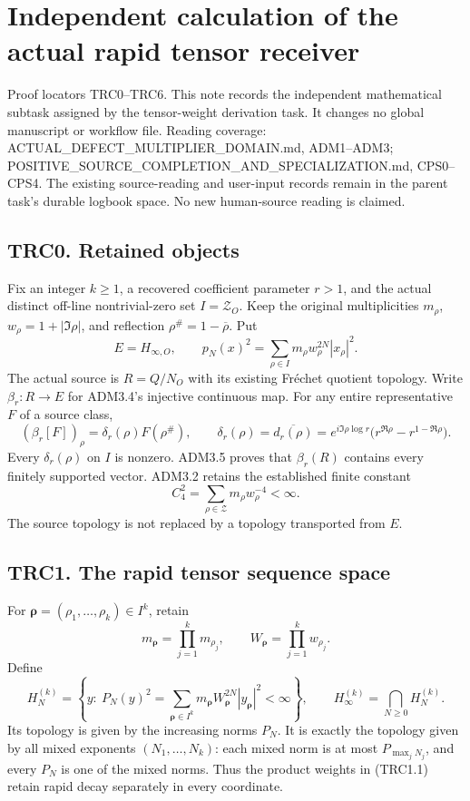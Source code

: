 \chapter{Independent calculation of the actual rapid tensor
receiver}\label{independent-calculation-of-the-actual-rapid-tensor-receiver}

Proof locators TRC0--TRC6. This note records the independent
mathematical subtask assigned by the tensor-weight derivation task. It
changes no global manuscript or workflow file. Reading coverage:
ACTUAL\_DEFECT\_MULTIPLIER\_DOMAIN.md, ADM1--ADM3;
POSITIVE\_SOURCE\_COMPLETION\_AND\_SPECIALIZATION.md, CPS0--CPS4. The
existing source-reading and user-input records remain in the parent
task's durable logbook space. No new human-source reading is claimed.

\section{TRC0. Retained objects}\label{trc0.-retained-objects}

Fix an integer \(k\ge1\), a recovered coefficient parameter \(r>1\), and
the actual distinct off-line nontrivial-zero set \(I=\mathscr Z_O\).
Keep the original multiplicities \(m_\rho\), \(w_\rho=1+|\Im\rho|\), and
reflection \(\rho^\#=1-\overline\rho\). Put \[
E=H_{\infty,O},\qquad p_N(x)^2=\sum_{\rho\in I}m_\rho w_\rho^{2N}|x_\rho|^2.
\] The actual source is \(R=Q/N_O\) with its existing Fréchet quotient
topology. Write \(\beta_r:R\to E\) for ADM3.4's injective continuous
map. For any entire representative \(F\) of a source class, \[
(\beta_r[F])_\rho=\delta_r(\rho)F(\rho^\#),\qquad
\delta_r(\rho)=\overline{d_r(\rho)}
=e^{i\Im\rho\log r}\bigl(r^{\Re\rho}-r^{1-\Re\rho}\bigr).
\tag{TRC0.1}
\] Every \(\delta_r(\rho)\) on \(I\) is nonzero. ADM3.5 proves that
\(\beta_r(R)\) contains every finitely supported vector. ADM3.2 retains
the established finite constant \[
C_4^2=\sum_{\rho\in\mathscr Z}m_\rho w_\rho^{-4}<\infty.
\tag{TRC0.2}
\] The source topology is not replaced by a topology transported from
\(E\).

\section{TRC1. The rapid tensor sequence
space}\label{trc1.-the-rapid-tensor-sequence-space}

For \(\boldsymbol\rho=(\rho_1,\ldots,\rho_k)\in I^k\), retain \[
m_{\boldsymbol\rho}=\prod_{j=1}^k m_{\rho_j},\qquad
W_{\boldsymbol\rho}=\prod_{j=1}^k w_{\rho_j}.
\] Define \[
H_N^{(k)}=\left\{y:\ P_N(y)^2=
\sum_{\boldsymbol\rho\in I^k}m_{\boldsymbol\rho}
W_{\boldsymbol\rho}^{2N}|y_{\boldsymbol\rho}|^2<\infty\right\},
\qquad H_\infty^{(k)}=\bigcap_{N\ge0}H_N^{(k)}.
\tag{TRC1.1}
\] Its topology is given by the increasing norms \(P_N\). It is exactly
the topology given by all mixed exponents \((N_1,\ldots,N_k)\): each
mixed norm is at most \(P_{\max_jN_j}\), and every \(P_N\) is one of the
mixed norms. Thus the product weights in (TRC1.1) retain rapid decay
separately in every coordinate.

